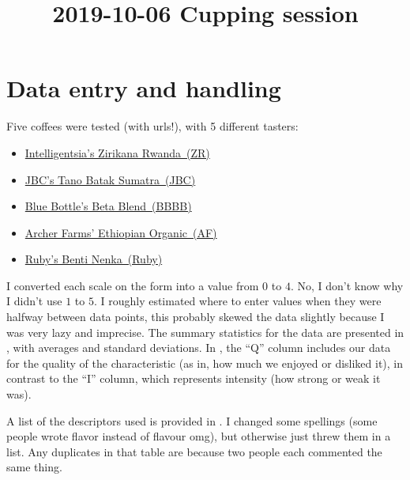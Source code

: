 \documentclass[12pt]{article}
\begin{document}
\title{2019-10-06 Cupping session}

\tableofcontents

\section{Data entry and handling} \label{sec:Data}

Five coffees were tested (with urls!), with 5 different tasters:
\begin{itemize}
	\item \href{https://www.intelligentsiacoffee.com/zirikana-rwanda}{Intelligentsia's Zirikana Rwanda~(ZR)}
	\item \href{https://www.jbccoffeeroasters.com/tano-batak-sumatra}{JBC's Tano Batak Sumatra~(JBC)}
	\item \href{https://bluebottlecoffee.com/store/beta-blend}{Blue Bottle's Beta Blend~(BBBB)}
	\item \href{https://www.target.com/p/organic-ethiopian-yirgacheffe-light-roast-whole-bean-coffee-10oz-archer-farms-153/-/A-50566950}{Archer Farms' Ethiopian Organic~(AF)}
	\item \href{https://rubycoffeeroasters.com/collections/coffee/products/ethiopia-benti-nenka}{Ruby's Benti Nenka~(Ruby)}
\end{itemize}

I converted each scale on the form into a value from $0$ to $4$.
No, I don't know why I didn't use $1$ to $5$.
I roughly estimated where to enter values when they were halfway between data points, this probably skewed the data slightly because I was very lazy and imprecise.
The summary statistics for the data are presented in , with averages and standard deviations.
In , the ``Q'' column includes our data for the quality of the characteristic (as in, how much we enjoyed or disliked it), in contrast to the ``I'' column, which represents intensity (how strong or weak it was).

A list of the descriptors used is provided in .
I changed some spellings (some people wrote flavor instead of flavour omg), but otherwise just threw them in a list.
Any duplicates in that table are because two people each commented the same thing.
\end{document}
